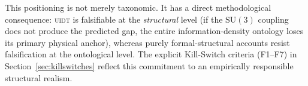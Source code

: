 \noindent
This positioning is not merely taxonomic. It has a direct methodological
consequence: \textsc{uidt} is falsifiable at the \emph{structural} level
(if the $\mathrm{SU}(3)$ coupling does not produce the predicted gap, the
entire information-density ontology loses its primary physical anchor),
whereas purely formal-structural accounts resist falsification at the
ontological level. The explicit Kill-Switch criteria (F1--F7) in
Section~\ref{sec:killswitches} reflect this commitment to an empirically
responsible structural realism.
